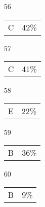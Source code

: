 \documentclass[12pt]{article}
\begin{document}
\begin{multicols}{5}
\begin{enumerate}
\item[]
\item[56] \begin{tabular}{cc} C & 42\%\end{tabular}
\item[57] \begin{tabular}{cc} C & 41\%\end{tabular}
\item[58] \begin{tabular}{cc} E & 22\%\end{tabular}
\item[59] \begin{tabular}{cc} B & 36\%\end{tabular}
\item[60] \begin{tabular}{cc} B & 9\%\end{tabular}

\item[]


\end{enumerate}
\end{multicols}
\end{document}
